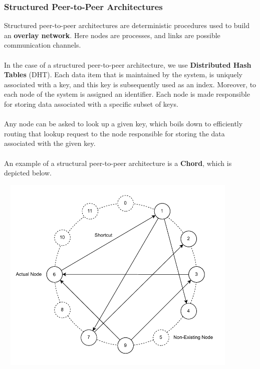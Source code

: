 \documentclass{article}
\begin{document}
\subsubsection{Structured Peer-to-Peer Architectures}
Structured peer-to-peer architectures are deterministic procedures used to build an \textbf{overlay network}. Here nodes are processes, and links are possible communication channels. \\ \\
In the case of a structured peer-to-peer architecture, we use \textbf{Distributed Hash Tables} (DHT). Each data item that is maintained by the system, is uniquely associated with a key, and this key is subsequently used as an index. Moreover, to each node of the system is assigned an identifier. Each node is made responsible for storing data associated with a specific subset of keys. \\ \\
Any node can be asked to look up a given key, which boils down to efficiently routing that lookup request to the node responsible for storing the data associated with the given key. \\ \\
An example of a structural peer-to-peer architecture is a \textbf{Chord}, which is depicted below.

\begin{center}
	\includegraphics[width=12cm, height=9.5cm, keepaspectratio]{assets/chord.pdf}
\end{center}
\end{document}
